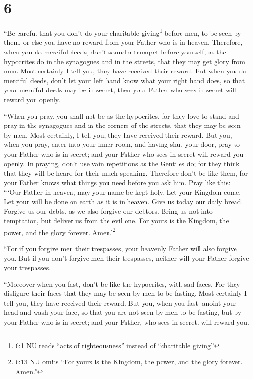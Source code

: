 \hypertarget{section-5}{%
\section{6}\label{section-5}}

 ``Be careful that you don't do your charitable
giving\footnote{6:1 NU reads ``acts of righteousness'' instead of
  ``charitable giving''} before men, to be seen by them, or else you
have no reward from your Father who is in heaven. 
Therefore, when you do merciful deeds, don't sound a trumpet before
yourself, as the hypocrites do in the synagogues and in the streets,
that they may get glory from men. Most certainly I tell you, they have
received their reward.  But when you do merciful deeds,
don't let your left hand know what your right hand does,  so
that your merciful deeds may be in secret, then your Father who sees in
secret will reward you openly.

 ``When you pray, you shall not be as the hypocrites, for
they love to stand and pray in the synagogues and in the corners of the
streets, that they may be seen by men. Most certainly, I tell you, they
have received their reward.  But you, when you pray, enter
into your inner room, and having shut your door, pray to your Father who
is in secret; and your Father who sees in secret will reward you openly.
 In praying, don't use vain repetitions as the Gentiles do;
for they think that they will be heard for their much speaking.
 Therefore don't be like them, for your Father knows what
things you need before you ask him.  Pray like this: ```Our
Father in heaven, may your name be kept holy.  Let your
Kingdom come. Let your will be done on earth as it is in heaven.
 Give us today our daily bread.  Forgive us
our debts, as we also forgive our debtors.  Bring us not
into temptation, but deliver us from the evil one. For yours is the
Kingdom, the power, and the glory forever. Amen.'\footnote{6:13 NU omits
  ``For yours is the Kingdom, the power, and the glory forever. Amen.''}

 ``For if you forgive men their trespasses, your heavenly
Father will also forgive you.  But if you don't forgive men
their trespasses, neither will your Father forgive your trespasses.

 ``Moreover when you fast, don't be like the hypocrites,
with sad faces. For they disfigure their faces that they may be seen by
men to be fasting. Most certainly I tell you, they have received their
reward.  But you, when you fast, anoint your head and wash
your face,  so that you are not seen by men to be fasting,
but by your Father who is in secret; and your Father, who sees in
secret, will reward you.

